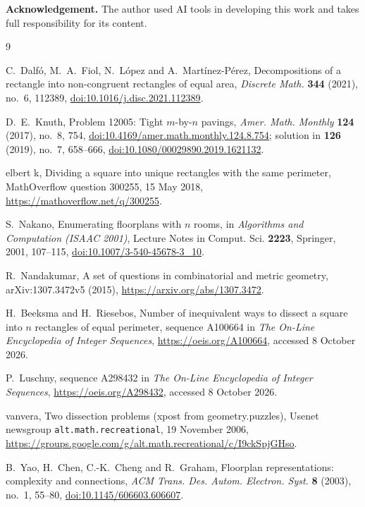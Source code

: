 \documentclass[11pt]{article}
\begin{document}
\textbf{Acknowledgement.} The author used AI tools in developing this work and takes full responsibility for its content.

\begin{thebibliography}{9}

C.~Dalf\'o, M.~A.~Fiol, N.~L\'opez and A.~Mart\'inez-P\'erez, Decompositions of a rectangle into non-congruent rectangles of equal area, \emph{Discrete Math.} \textbf{344} (2021), no.~6, 112389, \href{https://doi.org/10.1016/j.disc.2021.112389}{doi:10.1016/j.disc.2021.112389}.

D.~E.~Knuth, Problem 12005: Tight $m$-by-$n$ pavings, \emph{Amer. Math. Monthly} \textbf{124} (2017), no.~8, 754, \href{https://doi.org/10.4169/amer.math.monthly.124.8.754}{doi:10.4169/amer.math.monthly.124.8.754}; solution in \textbf{126} (2019), no.~7, 658--666, \href{https://doi.org/10.1080/00029890.2019.1621132}{doi:10.1080/00029890.2019.1621132}.

elbert k, Dividing a square into unique rectangles with the same perimeter, MathOverflow question 300255, 15 May 2018, \url{https://mathoverflow.net/q/300255}.

S.~Nakano, Enumerating floorplans with $n$ rooms, in \emph{Algorithms and Computation (ISAAC 2001)}, Lecture Notes in Comput. Sci. \textbf{2223}, Springer, 2001, 107--115, \href{https://doi.org/10.1007/3-540-45678-3_10}{doi:10.1007/3-540-45678-3\_10}.

R.~Nandakumar, A set of questions in combinatorial and metric geometry, arXiv:1307.3472v5 (2015), \url{https://arxiv.org/abs/1307.3472}.

H.~Beeksma and H.~Riesebos, Number of inequivalent ways to dissect a square into $n$ rectangles of equal perimeter, sequence A100664 in \emph{The On-Line Encyclopedia of Integer Sequences}, \url{https://oeis.org/A100664}, accessed 8 October 2026.

P.~Luschny, sequence A298432 in \emph{The On-Line Encyclopedia of Integer Sequences}, \url{https://oeis.org/A298432}, accessed 8 October 2026.

vanvera, Two dissection problems (xpost from geometry.puzzles), Usenet newsgroup \texttt{alt.math.recreational}, 19 November 2006, \url{https://groups.google.com/g/alt.math.recreational/c/I9ckSpjGHso}.

B.~Yao, H.~Chen, C.-K.~Cheng and R.~Graham, Floorplan representations: complexity and connections, \emph{ACM Trans. Des. Autom. Electron. Syst.} \textbf{8} (2003), no.~1, 55--80, \href{https://doi.org/10.1145/606603.606607}{doi:10.1145/606603.606607}.

\end{thebibliography}
\end{document}

